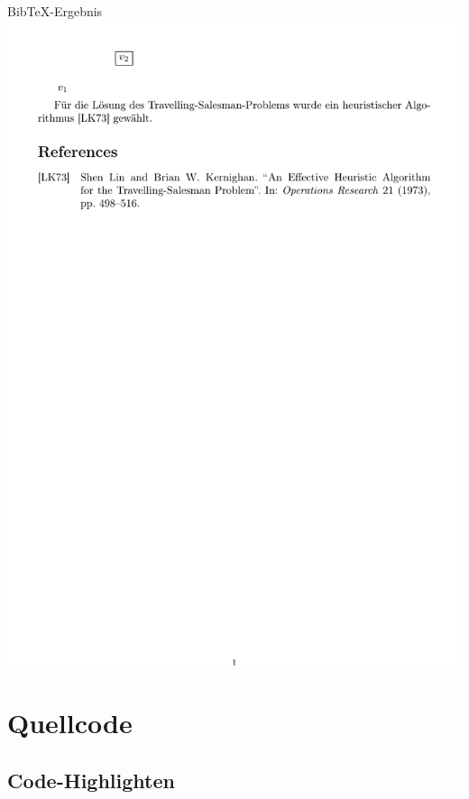 \documentclass{beamer}
\begin{document}

		\begin{frame}{Bib\TeX{}-Ergebnis}
			\vspace{0.75cm}
			\\
			\vspace{0.2cm}
			\includegraphics[width=\textwidth]{images/biblatex-example.pdf}
		\end{frame}

	\section{Quellcode}
		\sectionTitleFrame
	
		\subsection{Code-Highlighten}
\end{document}
